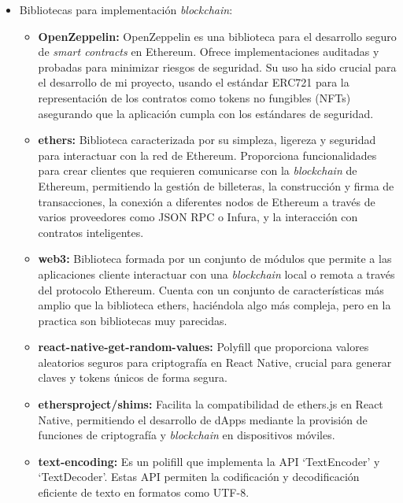 \begin{itemize}

\item Bibliotecas para implementación \textit{blockchain}:
\begin{itemize}

\item \textbf{OpenZeppelin:} OpenZeppelin es una biblioteca para el desarrollo seguro de \textit{smart contracts} en Ethereum. Ofrece implementaciones auditadas y probadas para minimizar riesgos de seguridad.
Su uso ha sido crucial para el desarrollo de mi proyecto, usando el estándar ERC721 para la representación de los contratos como tokens no fungibles (NFTs) asegurando que la aplicación cumpla con los estándares de seguridad.

\item \textbf{ethers:} Biblioteca caracterizada por su simpleza, ligereza y seguridad para interactuar con la red de Ethereum. Proporciona funcionalidades para crear clientes que requieren comunicarse con la \textit{blockchain} de Ethereum, permitiendo la gestión de billeteras, la construcción y firma de transacciones, la conexión a diferentes nodos de Ethereum a través de varios proveedores como JSON RPC o Infura, y la interacción con contratos inteligentes.

\item \textbf{web3:} Biblioteca formada por un conjunto de módulos que permite a las aplicaciones cliente interactuar con una \textit{blockchain} local o remota a través del protocolo Ethereum. 
Cuenta con un conjunto de características más amplio que la biblioteca ethers, haciéndola algo más compleja, pero en la practica son bibliotecas muy parecidas.

\item \textbf{react-native-get-random-values:} Polyfill que proporciona valores aleatorios seguros para criptografía en React Native, crucial para generar claves y tokens únicos de forma segura.

\item \textbf{ethersproject/shims:} Facilita la compatibilidad de ethers.js en React Native, permitiendo el desarrollo de dApps mediante la provisión de funciones de criptografía y \textit{blockchain} en dispositivos móviles.

\item \textbf{text-encoding:} Es un polifill que implementa la API `TextEncoder' y `TextDecoder'. Estas API permiten la codificación y decodificación eficiente de texto en formatos como UTF-8.


\end{itemize}
\end{itemize}
